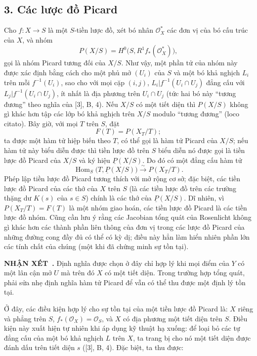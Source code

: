 \documentclass[11pt,twoside,openany]{book}
\numberwithin{equation}{section}
\newcommand{\result}[2]{\par\medskip\noindent\textbf{#1\if\relax\detokenize{#2}\relax\else\ #2\fi.}\quad}
\begin{document}
\subsection*{3. Các lược đồ Picard}

Cho $f:X\longrightarrow S$ là một $S$-tiền lược đồ, xét bó nhân
$\mathcal O_X^*$ các đơn vị của bó cấu trúc của $X$, và nhóm
\[
  P(X/S)=H^0\bigl(S,R^1f_*(\mathcal O_X^*)\bigr),
\]
gọi là nhóm Picard tương đối của $X/S$. Như vậy, một phần tử của nhóm này được
xác định bằng cách cho một phủ mở $(U_i)$ của $S$ và một bó khả nghịch $L_i$
trên mỗi $f^{-1}(U_i)$, sao cho với mọi cặp $(i,j)$,
$L_i|f^{-1}(U_i\cap U_j)$ đẳng cấu với
$L_j|f^{-1}(U_i\cap U_j)$, ít nhất là địa phương trên $U_i\cap U_j$ (tức hai bó
này ``tương đương'' theo nghĩa của [3], B, 4). Nếu $X/S$ có một tiết diện thì
$P(X/S)$ không gì khác hơn tập các lớp bó khả nghịch trên $X/S$ modulo
``tương đương'' (loco citato). Bây giờ, với mọi $T$ trên $S$, đặt
\[
  F(T)=P(X_T/T) ;
\]
ta được một hàm tử hiệp biến theo $T$, có thể gọi là hàm tử Picard của $X/S$;
nếu hàm tử này biểu diễn được thì tiền lược đồ trên $S$ biểu diễn nó được gọi
là tiền lược đồ Picard của $X/S$ và ký hiệu $\underline P(X/S)$. Do đó có một
đẳng cấu hàm tử
\[
  \operatorname{Hom}_S\bigl(T,\underline P(X/S)\bigr)
  \xrightarrow{\sim}P(X_T/T).
\]
Phép lập tiền lược đồ Picard tương thích với mở rộng cơ sở; đặc biệt, các tiền
lược đồ Picard của các thớ của $X$ trên $S$ (là các tiền lược đồ trên các
trường thặng dư $K(s)$ của $s\in S$) chính là các thớ của
$\underline P(X/S)$. Dĩ nhiên, vì $P(X_T/T)=F(T)$ là một nhóm giao hoán, các
tiền lược đồ Picard là các tiền lược đồ nhóm. Cũng cần lưu ý rằng các Jacobian
tổng quát của Rosenlicht không gì khác hơn các thành phần liên thông của đơn
vị trong các lược đồ Picard của những đường cong đầy đủ có thể có kỳ dị; điều
này hẳn làm hiển nhiên phần lớn các tính chất của chúng (một khi đã chứng minh
sự tồn tại).

\result{NHẬN XÉT}{} Định nghĩa được chọn ở đây chỉ hợp lý khi mọi điểm của
$Y$ có một lân cận mở $U$ mà trên đó $X$ có một tiết diện. Trong trường hợp
tổng quát, phải sửa nhẹ định nghĩa hàm tử Picard để vẫn có thể thu được một
định lý tồn tại.

Ở đây, các điều kiện hợp lý cho sự tồn tại của một tiền lược đồ Picard là:
$X$ riêng và phẳng trên $S$, $f_*(\mathcal O_X)=\mathcal O_S$, và $X$ có địa
phương một tiết diện trên $S$. Điều kiện này xuất hiện tự nhiên khi áp dụng kỹ
thuật hạ xuống: để loại bỏ các tự đẳng cấu của một bó khả nghịch $L$ trên $X$,
ta trang bị cho nó một tiết diện được đánh dấu trên tiết diện $s$ ([3], B, 4).
Đặc biệt, ta thu được:
\end{document}
